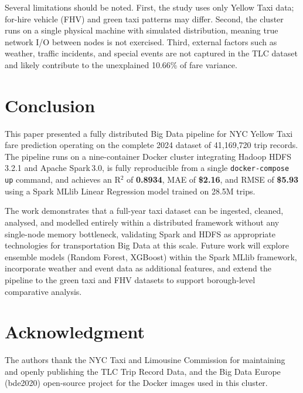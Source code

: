 \documentclass[conference]{IEEEtran}
\begin{document}
Several limitations should be noted. First, the study uses
only Yellow Taxi data; for-hire vehicle (FHV) and green taxi
patterns may differ. Second, the cluster runs on a single
physical machine with simulated distribution, meaning
true network I/O between nodes is not exercised. Third,
external factors such as weather, traffic incidents, and
special events are not captured in the TLC dataset and
likely contribute to the unexplained 10.66\% of fare
variance.

\section{Conclusion}
\label{sec:conclusion}

This paper presented a fully distributed Big Data pipeline
for NYC Yellow Taxi fare prediction operating on the complete
2024 dataset of 41,169,720 trip records. The pipeline runs on
a nine-container Docker cluster integrating Hadoop HDFS\,3.2.1
and Apache Spark\,3.0, is fully reproducible from a single
\texttt{docker-compose up} command, and achieves an R$^{2}$ of
\textbf{0.8934}, MAE of \textbf{\$2.16}, and RMSE of
\textbf{\$5.93} using a Spark MLlib Linear Regression model
trained on 28.5M trips.

The work demonstrates that a full-year taxi dataset can be
ingested, cleaned, analysed, and modelled entirely within a
distributed framework without any single-node memory
bottleneck, validating Spark and HDFS as appropriate
technologies for transportation Big Data at this scale. Future
work will explore ensemble models (Random Forest, XGBoost)
within the Spark MLlib framework, incorporate weather and
event data as additional features, and extend the pipeline to
the green taxi and FHV datasets to support borough-level
comparative analysis.

\section*{Acknowledgment}

The authors thank the NYC Taxi and Limousine Commission for
maintaining and openly publishing the TLC Trip Record Data,
and the Big Data Europe (bde2020) open-source project for the
Docker images used in this cluster.
\end{document}
